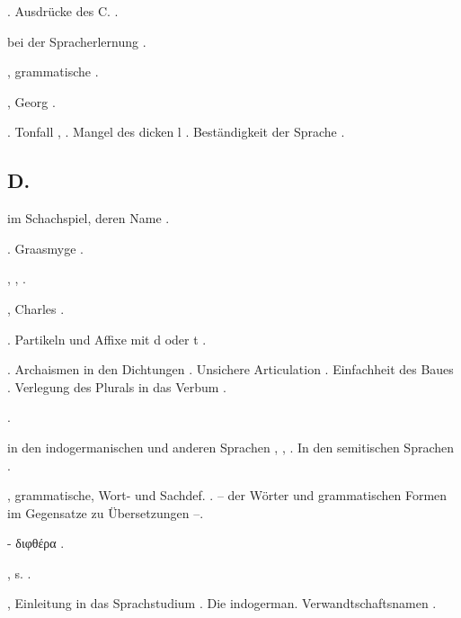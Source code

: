 \begin{register}
. Ausdrücke des C. \pageref{sp.107}.

 bei der Spracherlernung \pageref{sp.78}.

, grammatische \pageref{sp.111}.

, Georg \pageref{sp.80}. 


. Tonfall \pageref{sp.34}, \pageref{sp.431}. Mangel des dicken l \pageref{sp.269}. Beständigkeit der Sprache \pageref{sp.428}.

\subsection*{D.}\label{reg.D}

 im Schachspiel, deren Name \pageref{sp.268}.

. Graasmyge \pageref{sp.216}.

 \pageref{sp.160}, \pageref{sp.282}, \pageref{sp.307}.

, Charles \pageref{sp.15}.

 \pageref{sp.102}. Partikeln und Affixe mit d oder t \pageref{sp.153}.

. Archaismen in den Dichtungen \pageref{sp.107}. Unsichere Articulation \pageref{sp.194}.  Einfachheit des Baues \pageref{sp.349}. Verlegung des Plurals in das Verbum \pageref{sp.446}.

 \pageref{sp.315}.

 in den indogermanischen und anderen Sprachen \pageref{sp.352}, \pageref{sp.398}, \pageref{sp.400}. In den semitischen Sprachen \pageref{sp.420}.

, grammatische, Wort- und Sachdef. \pageref{sp.1}. – der Wörter und grammatischen Formen im Gegensatze zu Übersetzungen \pageref{sp.47}–\pageref{sp.48}.

 - διφθέρα \pageref{sp.264}.

, s. .

, Einleitung in das Sprachstudium \pageref{sp.171}\sed{, \pageref{sp.180}}. Die indogerman. Verwandtschaftsnamen \pageref{sp.294}.



\end{register}
